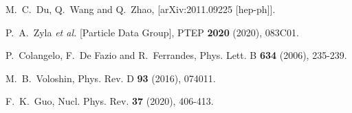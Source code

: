 \documentclass[preprint,12pt,3p]{elsarticle}
\begin{document}
\begin{thebibliography}{99}




M.~C.~Du, Q.~Wang and Q.~Zhao,
[arXiv:2011.09225 [hep-ph]].

P.~A.~Zyla \textit{et al.} [Particle Data Group],
PTEP \textbf{2020} (2020), 083C01.

P.~Colangelo, F.~De Fazio and R.~Ferrandes,
Phys. Lett. B \textbf{634} (2006), 235-239.

M.~B.~Voloshin,
Phys. Rev. D \textbf{93} (2016), 074011.
 
F.~K.~Guo,
Nucl. Phys. Rev. \textbf{37} (2020), 406-413.
 
\end{thebibliography}
\end{document}
